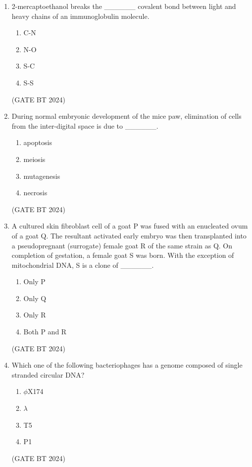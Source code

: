 \documentclass[journal,12pt,onecolumn]{IEEEtran}
\theoremstyle{remark}
\begin{document}
\begin{enumerate}
\item 
2-mercaptoethanol breaks the \_\_\_\_\_\_ covalent bond between light and heavy chains of an immunoglobulin molecule.

\begin{enumerate}
    \item C-N
    \item N-O
    \item S-C
    \item S-S
\end{enumerate}
\hfill(GATE BT 2024)

\item 
During normal embryonic development of the mice paw, elimination of cells from the inter-digital space is due to \_\_\_\_\_\_.

\begin{enumerate}
    \item apoptosis
    \item meiosis
    \item mutagenesis
    \item necrosis
\end{enumerate}
\hfill(GATE BT 2024)

\item 
A cultured skin fibroblast cell of a goat P was fused with an enucleated ovum of a goat Q. The resultant activated early embryo was then transplanted into a pseudopregnant (surrogate) female goat R of the same strain as Q. On completion of gestation, a female goat S was born. With the exception of mitochondrial DNA, S is a clone of \_\_\_\_\_\_.

\begin{enumerate}
    \item Only P
    \item Only Q
    \item Only R
    \item Both P and R
\end{enumerate}
\hfill(GATE BT 2024)

\item 
Which one of the following bacteriophages has a genome composed of single stranded circular DNA?

\begin{enumerate}
    \item $\phi$X174
    \item $\lambda$
    \item T5
    \item P1
\end{enumerate}
\hfill(GATE BT 2024)


\end{enumerate}
\end{document}
